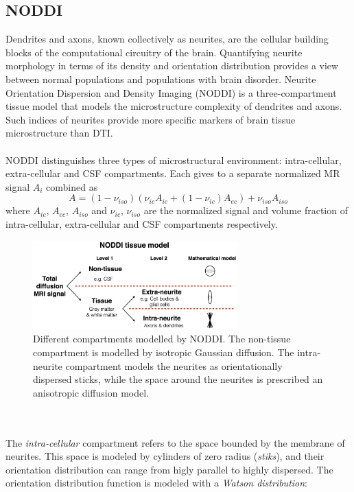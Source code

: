  \subsection{NODDI}
 Dendrites and axons, known collectively as neurites, are the cellular building blocks of the computational circuitry of the brain. Quantifying neurite morphology in terms of its density and orientation distribution provides a view between normal populations and populations with brain disorder. \cite{zhang2012noddi}
 Neurite Orientation Dispersion and Density Imaging (NODDI) is a three-compartment tissue model that models the microstructure complexity of dendrites and axons. Such indices of neurites provide more specific markers of brain tissue microstructure than DTI. \cite{zhang2012noddi}
 \\\\
 NODDI distinguishes three types of microstructural environment: intra-cellular, extra-cellular and CSF compartments. Each gives to a separate normalized MR signal $A_i$ combined as
 \begin{equation}
   A=(1-\nu_{iso})(\nu_{ic}A_{ic}+(1-\nu_{ic})A_{ec})+\nu_{iso}A_{iso}
 \end{equation}
 where $A_{ic}$, $A_{ec}$, $A_{iso}$ and $\nu_{ic}$, $\nu_{iso}$ are the normalized signal and volume fraction of intra-cellular, extra-cellular and CSF compartments respectively.
 \begin{figure}[h]
   \centering
   \includegraphics[width=0.70\textwidth]{images/noddi_tissues.jpg}
   \caption{Different compartments modelled by NODDI. The non-tissue compartment is modelled by isotropic Gaussian diffusion. The intra-neurite compartment models the neurites as orientationally dispersed sticks, while the space around the neurites is prescribed an anisotropic diffusion model. \cite{TARIQ2016207}}
   \label{fig:compartments}
 \end{figure}
 \\\\
 The \emph{intra-cellular} compartment refers to the space bounded by the membrane of neurites. This space is modeled by cylinders of zero radius (\emph{stiks}), and their orientation distribution can range from higly parallel to highly dispersed. The orientation distribution function is modeled with a \emph{Watson distribution}:


